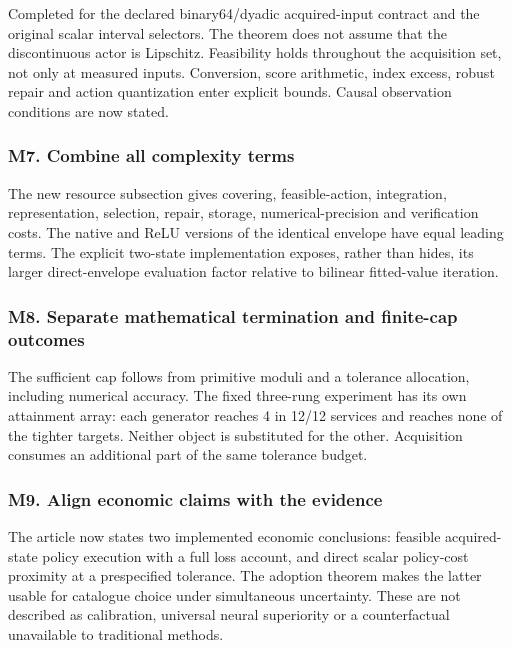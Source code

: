 \documentclass[ecta,nameyear,draft]{econsocart}
\begin{document}
Completed for the declared binary64/dyadic acquired-input contract and
the original scalar interval selectors. The theorem does not assume that
the discontinuous actor is Lipschitz. Feasibility holds throughout the
acquisition set, not only at measured inputs. Conversion, score
arithmetic, index excess, robust repair and action quantization enter
explicit bounds. Causal observation conditions are now stated.

\hypertarget{m7-combine-all-complexity-terms}{%
\subsubsection{M7. Combine all complexity
terms}\label{m7-combine-all-complexity-terms}}

The new resource subsection gives covering, feasible-action,
integration, representation, selection, repair, storage,
numerical-precision and verification costs. The native and ReLU versions
of the identical envelope have equal leading terms. The explicit
two-state implementation exposes, rather than hides, its larger
direct-envelope evaluation factor relative to bilinear fitted-value
iteration.

\hypertarget{m8-separate-mathematical-termination-and-finite-cap-outcomes}{%
\subsubsection{M8. Separate mathematical termination and finite-cap
outcomes}\label{m8-separate-mathematical-termination-and-finite-cap-outcomes}}

The sufficient cap follows from primitive moduli and a tolerance
allocation, including numerical accuracy. The fixed three-rung
experiment has its own attainment array: each generator reaches 4 in
12/12 services and reaches none of the tighter targets. Neither object
is substituted for the other. Acquisition consumes an additional part of
the same tolerance budget.

\hypertarget{m9-align-economic-claims-with-the-evidence}{%
\subsubsection{M9. Align economic claims with the
evidence}\label{m9-align-economic-claims-with-the-evidence}}

The article now states two implemented economic conclusions: feasible
acquired-state policy execution with a full loss account, and direct
scalar policy-cost proximity at a prespecified tolerance. The adoption
theorem makes the latter usable for catalogue choice under simultaneous
uncertainty. These are not described as calibration, universal neural
superiority or a counterfactual unavailable to traditional methods.
\end{document}
